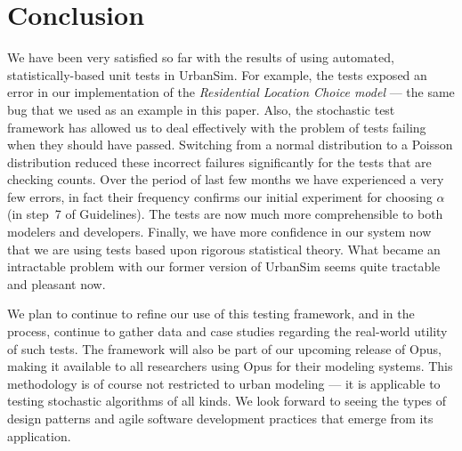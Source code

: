 
\section{Conclusion}
\label{sec:conclusion}

We have been very satisfied so far with the results of using automated,
statistically-based unit tests in UrbanSim.  For example, the tests exposed an
error in our implementation of the \emph{Residential Location Choice model}
--- the same bug that we used as an example in this paper.  Also, the
stochastic test framework has allowed us to deal effectively with the problem
of tests failing when they should have passed. Switching from a normal
distribution to a Poisson distribution reduced these incorrect failures
significantly for the tests that are checking counts. Over the period of last
few months we have experienced a very few errors, in fact their frequency
confirms our initial experiment for choosing $\alpha$ (in step~7 of
Guidelines). The tests are now much more comprehensible to both modelers and
developers.  Finally, we have more confidence in our system now that we are
using tests based upon rigorous statistical theory.  What became an
intractable problem with our former version of UrbanSim seems quite tractable
and pleasant now.

We plan to continue to refine our use of this testing framework, and in the
process, continue to gather data and case studies regarding the real-world
utility of such tests.  The framework will also be part of our upcoming
release of Opus, making it available to all researchers using Opus for
their modeling systems.  This methodology is of course not restricted to
urban modeling --- it is applicable to testing stochastic algorithms of all
kinds.  We look forward to seeing the types of design patterns and agile
software development practices that emerge from its application.


